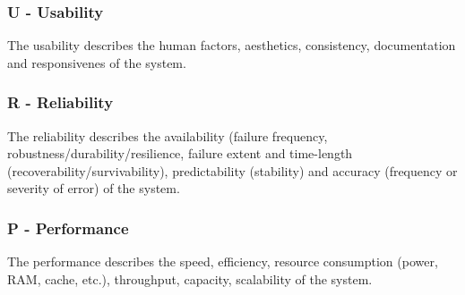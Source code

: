 \subsubsection{\textbf{U} - Usability}
The usability describes the human factors, aesthetics, consistency, documentation and responsivenes of the system. \\

\subsubsection{\textbf{R} - Reliability}
The reliability describes the availability (failure frequency, robustness/durability/resilience, failure extent and time-length (recoverability/survivability), predictability (stability) and accuracy (frequency or severity of error) of the system. \\

\subsubsection{\textbf{P} - Performance}
The performance describes the speed, efficiency, resource consumption (power, RAM, cache, etc.), throughput, capacity, scalability of the system. \\


